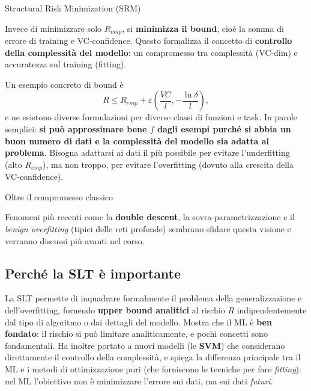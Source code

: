 \begin{boxdefinition}{Structural Risk Minimization (SRM)}

Invece di minimizzare solo \(R_{emp}\), si \textbf{minimizza il bound},
cioè la somma di errore di training e VC-confidence. Questo formalizza
il concetto di \textbf{controllo della complessità del modello}: un
compromesso tra complessità (VC-dim) e accuratezza sul training
(fitting).

\end{boxdefinition}

Un esempio concreto di bound è \[
R \le R_{emp} + \varepsilon\left(\frac{VC}{l}, -\frac{\ln\delta}{l}\right),
\] e ne esistono diverse formulazioni per diverse classi di funzioni e
task. In parole semplici: \textbf{si può approssimare bene \(f\) dagli
esempi purché si abbia un buon numero di dati e la complessità del
modello sia adatta al problema}. Bisogna adattarsi ai dati il più
possibile per evitare l'underfitting (alto \(R_{emp}\)), ma non troppo,
per evitare l'overfitting (dovuto alla crescita della VC-confidence).

\begin{boxnote}{Oltre il compromesso classico}

Fenomeni più recenti come la \textbf{double descent}, la
sovra-parametrizzazione e il \emph{benign overfitting} (tipici delle
reti profonde) sembrano sfidare questa visione e verranno discussi più
avanti nel corso.

\end{boxnote}

\subsection{Perché la SLT è
importante}\label{perchuxe9-la-slt-uxe8-importante}

La SLT permette di inquadrare formalmente il problema della
generalizzazione e dell'overfitting, fornendo \textbf{upper bound
analitici} al rischio \(R\) indipendentemente dal tipo di algoritmo o
dai dettagli del modello. Mostra che il ML è \textbf{ben fondato}: il
rischio si può limitare analiticamente, e pochi concetti sono
fondamentali. Ha inoltre portato a nuovi modelli (le \textbf{SVM}) che
considerano direttamente il controllo della complessità, e spiega la
differenza principale tra il ML e i metodi di ottimizzazione puri (che
forniscono le tecniche per fare \emph{fitting}): nel ML l'obiettivo non
è minimizzare l'errore sui dati, ma sui dati \emph{futuri}.

